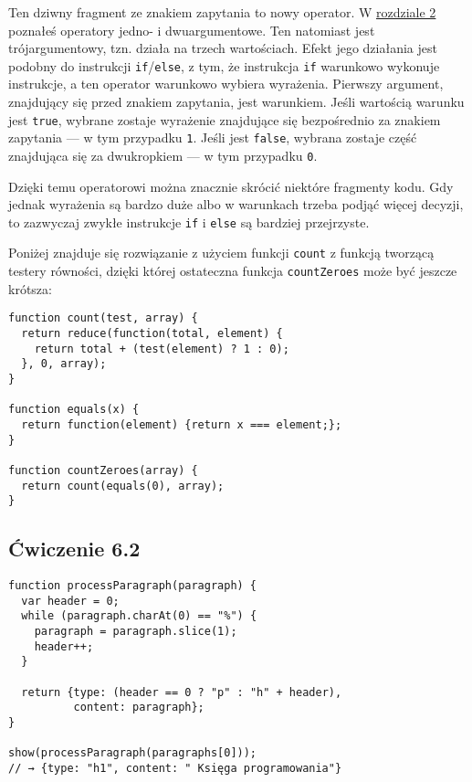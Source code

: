 Ten dziwny fragment ze znakiem zapytania to nowy operator. W \hyperref[chap:2]{rozdziale 2} poznałeś operatory jedno- i dwuargumentowe. Ten natomiast jest trójargumentowy, tzn. działa na trzech wartościach. Efekt jego działania jest podobny do instrukcji \texttt{if}/\texttt{else}, z tym, że instrukcja \texttt{if} warunkowo wykonuje instrukcje, a ten operator warunkowo wybiera wyrażenia. Pierwszy argument, znajdujący się przed znakiem zapytania, jest warunkiem. Jeśli wartością warunku jest \texttt{true}, wybrane zostaje wyrażenie znajdujące się bezpośrednio za znakiem zapytania — w tym przypadku \texttt{1}. Jeśli jest \texttt{false}, wybrana zostaje część znajdująca się za dwukropkiem — w tym przypadku \texttt{0}.

    
Dzięki temu operatorowi można znacznie skrócić niektóre fragmenty kodu. Gdy jednak wyrażenia są bardzo duże albo w warunkach trzeba podjąć więcej decyzji, to zazwyczaj zwykłe instrukcje \texttt{if} i \texttt{else} są bardziej przejrzyste.

    
Poniżej znajduje się rozwiązanie z użyciem funkcji \texttt{count} z funkcją tworzącą testery równości, dzięki której ostateczna funkcja \texttt{countZeroes} może być jeszcze krótsza:

    
\begin{verbatim} 
function count(test, array) {
  return reduce(function(total, element) {
    return total + (test(element) ? 1 : 0);
  }, 0, array);
}

function equals(x) {
  return function(element) {return x === element;};
}

function countZeroes(array) {
  return count(equals(0), array);
}
\end{verbatim}

  
\subsection*{Ćwiczenie 6.2}
\label{sol:6.2}
    
\begin{verbatim} 
function processParagraph(paragraph) {
  var header = 0;
  while (paragraph.charAt(0) == "%") {
    paragraph = paragraph.slice(1);
    header++;
  }

  return {type: (header == 0 ? "p" : "h" + header),
          content: paragraph};
}

show(processParagraph(paragraphs[0]));
// → {type: "h1", content: " Księga programowania"}
\end{verbatim}

